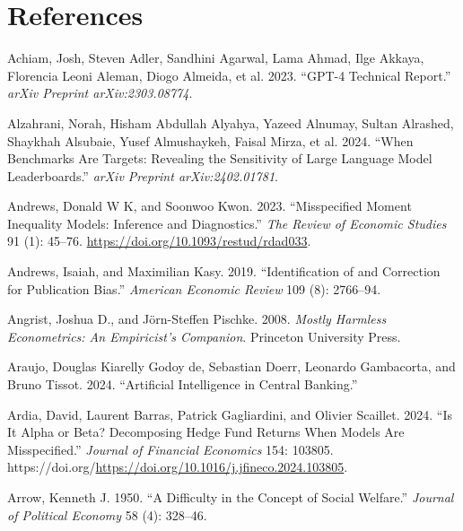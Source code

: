 \documentclass[
]{article}
\newlength{\cslhangindent}
\newenvironment{CSLReferences}[2] %
 {\begin{list}{}{%
  \setlength{\itemindent}{0pt}
  \setlength{\leftmargin}{0pt}
  \setlength{\parsep}{0pt}
  \ifodd #1
   \setlength{\leftmargin}{\cslhangindent}
   \setlength{\itemindent}{-1\cslhangindent}
  \fi
  \setlength{\itemsep}{#2\baselineskip}}}
 {\end{list}}
\theoremstyle{plain}
\theoremstyle{definition}
\theoremstyle{remark}
\begin{document}
\section*{References}\label{references}

\label{refs}
\begin{CSLReferences}{1}{0}
Achiam, Josh, Steven Adler, Sandhini Agarwal, Lama Ahmad, Ilge Akkaya,
Florencia Leoni Aleman, Diogo Almeida, et al. 2023. {``GPT-4 Technical
Report.''} \emph{arXiv Preprint arXiv:2303.08774}.

Alzahrani, Norah, Hisham Abdullah Alyahya, Yazeed Alnumay, Sultan
Alrashed, Shaykhah Alsubaie, Yusef Almushaykeh, Faisal Mirza, et al.
2024. {``When Benchmarks Are Targets: Revealing the Sensitivity of Large
Language Model Leaderboards.''} \emph{arXiv Preprint arXiv:2402.01781}.

Andrews, Donald W K, and Soonwoo Kwon. 2023. {``{Misspecified Moment
Inequality Models: Inference and Diagnostics}.''} \emph{The Review of
Economic Studies} 91 (1): 45--76.
\url{https://doi.org/10.1093/restud/rdad033}.

Andrews, Isaiah, and Maximilian Kasy. 2019. {``Identification of and
Correction for Publication Bias.''} \emph{American Economic Review} 109
(8): 2766--94.

Angrist, Joshua D., and Jörn-Steffen Pischke. 2008. \emph{Mostly
Harmless Econometrics: An Empiricist's Companion}. Princeton University
Press.

Araujo, Douglas Kiarelly Godoy de, Sebastian Doerr, Leonardo Gambacorta,
and Bruno Tissot. 2024. {``Artificial Intelligence in Central
Banking.''}

Ardia, David, Laurent Barras, Patrick Gagliardini, and Olivier Scaillet.
2024. {``Is It Alpha or Beta? Decomposing Hedge Fund Returns When Models
Are Misspecified.''} \emph{Journal of Financial Economics} 154: 103805.
https://doi.org/\url{https://doi.org/10.1016/j.jfineco.2024.103805}.

Arrow, Kenneth J. 1950. {``A Difficulty in the Concept of Social
Welfare.''} \emph{Journal of Political Economy} 58 (4): 328--46.


\end{CSLReferences}
\end{document}
